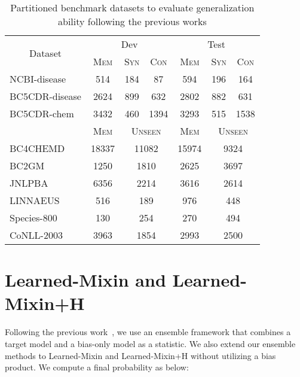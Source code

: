 \documentclass[11pt]{article}
\begin{document}
\begin{table}[h]
\centering
\begin{adjustbox}{width=0.48\textwidth}
\begin{tabular}{l c c c c c c }
\toprule
\multicolumn{1}{c}{\multirow{2}{*}{Dataset}} & \multicolumn{3}{c}{Dev}              & \multicolumn{3}{c}{Test}              \\ \cmidrule{2-7} 
\multicolumn{1}{c}{} & \textsc{Mem}     & \textsc{Syn}          & \textsc{Con}          & \textsc{Mem}      & \textsc{Syn}          & \textsc{Con}          \\ \midrule
NCBI-disease             & 514     & 184          & 87           & 594      & 196          & 164          \\ 
BC5CDR-disease           & 2624    & 899          & 632          & 2802     & 882          & 631          \\ 
BC5CDR-chem              & 3432    & 460          & 1394         & 3293     & 515          & 1538         \\ \midrule
 & \textsc{Mem}     & \multicolumn{2}{c}{\textsc{Unseen}} & \textsc{Mem}      & \multicolumn{2}{c}{\textsc{Unseen}} \\ \midrule
BC4CHEMD                 & 18337   & \multicolumn{2}{c}{11082}  & 15974    & \multicolumn{2}{c}{9324}   \\ 
BC2GM                    & 1250    & \multicolumn{2}{c}{1810}   & 2625     & \multicolumn{2}{c}{3697}   \\ 
JNLPBA                   & 6356    & \multicolumn{2}{c}{2214}   & 3616     & \multicolumn{2}{c}{2614}   \\ 
LINNAEUS                 & 516     & \multicolumn{2}{c}{189}    & 976      & \multicolumn{2}{c}{448}    \\ 
Species-800              & 130     & \multicolumn{2}{c}{254}    & 270      & \multicolumn{2}{c}{494}    \\ 
CoNLL-2003               & 3963    & \multicolumn{2}{c}{1854}   & 2993     & \multicolumn{2}{c}{2500}   \\ \bottomrule
\end{tabular}
\end{adjustbox}
\caption{Partitioned benchmark datasets to evaluate generalization ability following the previous works \protect\cite{lin2020rigourous,kim2021your}}
\label{tab:partition dataset}
\end{table}

\section{Learned-Mixin and Learned-Mixin+H}
\label{app:learned-mixin}
Following the previous work~\cite{clark2019don}, we use an ensemble framework that combines a target model  and a bias-only model  as a statistic.
We also extend our ensemble methods to Learned-Mixin and Learned-Mixin+H without utilizing a bias product.
We compute a final probability as below:
\end{document}
